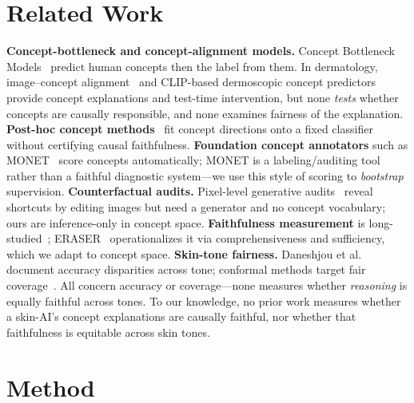 \documentclass{svproc}
\begin{document}
\section{Related Work}

\textbf{Concept-bottleneck and concept-alignment models.} Concept Bottleneck
Models~\cite{koh2020} predict human concepts then the label from them. In dermatology,
image--concept alignment~\cite{bie2024mica} and CLIP-based dermoscopic concept
predictors~\cite{patricio2024} provide concept explanations and test-time
intervention, but none \emph{tests} whether concepts are causally responsible, and
none examines fairness of the explanation.
\textbf{Post-hoc concept methods}~\cite{yuksekgonul2023} fit concept directions onto a
fixed classifier without certifying causal faithfulness.
\textbf{Foundation concept annotators} such as MONET~\cite{kim2024monet} score
concepts automatically; MONET is a labeling/auditing tool rather than a faithful
diagnostic system---we use this style of scoring to \emph{bootstrap} supervision.
\textbf{Counterfactual audits.} Pixel-level generative audits~\cite{degrave2023}
reveal shortcuts by editing images but need a generator and no concept vocabulary;
ours are inference-only in concept space.
\textbf{Faithfulness measurement} is long-studied~\cite{jacovi2020,adebayo2018};
ERASER~\cite{deyoung2020} operationalizes it via comprehensiveness and sufficiency,
which we adapt to concept space.
\textbf{Skin-tone fairness.} Daneshjou et al.~\cite{daneshjou2022} document accuracy
disparities across tone; conformal methods target fair coverage~\cite{lu2022}. All
concern accuracy or coverage---none measures whether \emph{reasoning} is equally
faithful across tones. To our knowledge, no prior work measures whether a skin-AI's
concept explanations are causally faithful, nor whether that faithfulness is equitable
across skin tones.

\section{Method}
\end{document}
